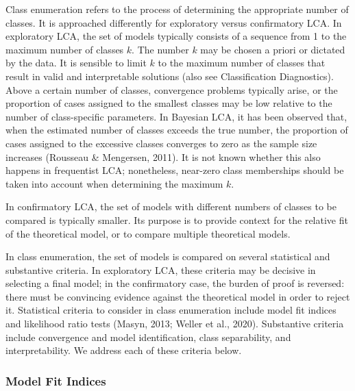 \documentclass[
  ,man,floatsintext]{apa6}
\begin{document}
Class enumeration refers to the process of determining the appropriate number of classes.
It is approached differently for exploratory versus confirmatory LCA.
In exploratory LCA, the set of models typically consists of a sequence from 1 to the maximum number of classes \(k\).
The number \(k\) may be chosen a priori or dictated by the data.
It is sensible to limit \(k\) to the maximum number of classes that result in valid and interpretable solutions (also see Classification Diagnostics).
Above a certain number of classes,
convergence problems typically arise,
or the proportion of cases assigned to the smallest classes may be low relative to the number of class-specific parameters.
In Bayesian LCA, it has been observed that, when the estimated number of classes exceeds the true number,
the proportion of cases assigned to the excessive classes converges to zero as the sample size increases (Rousseau \& Mengersen, 2011).
It is not known whether this also happens in frequentist LCA;
nonetheless, near-zero class memberships should be taken into account when determining the maximum \(k\).

In confirmatory LCA,
the set of models with different numbers of classes to be compared is typically smaller.
Its purpose is to provide context for the relative fit of the theoretical model, or to compare multiple theoretical models.

In class enumeration, the set of models is compared on several statistical and substantive criteria.
In exploratory LCA, these criteria may be decisive in selecting a final model;
in the confirmatory case, the burden of proof is reversed: there must be convincing evidence against the theoretical model in order to reject it.
Statistical criteria to consider in class enumeration include model fit indices and
likelihood ratio tests (Masyn, 2013; Weller et al., 2020).
Substantive criteria include convergence and model identification,
class separability,
and interpretability.
We address each of these criteria below.

\hypertarget{model-fit-indices}{%
\subsubsection{Model Fit Indices}\label{model-fit-indices}}
\end{document}
